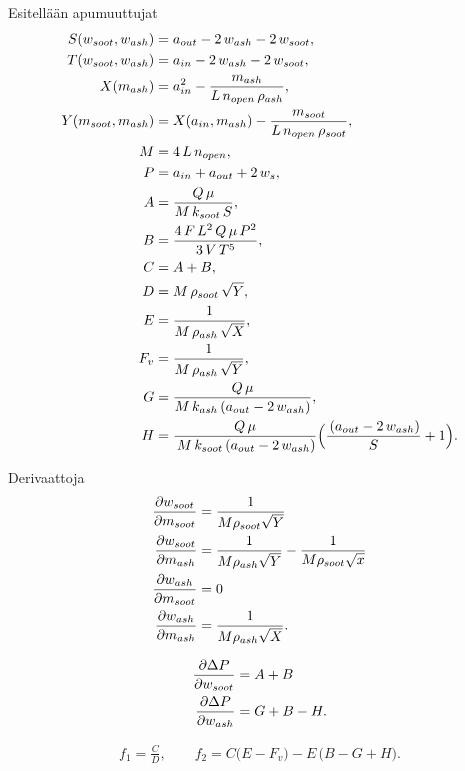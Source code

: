 \newpage
Esitellään apumuuttujat
\begin{align*}
S(w_{{soot}}, w_{{ash}}) &=a_{{out}}-2\,w_{{ash}}-2\,w_{{soot}},\\
T(w_{{soot}}, w_{{ash}}) &=a_{{in}}-2\,w_{{ash}}-2\,w_{{soot}},\\
X(m_{{ash}})            &=a_{{in}}^2 -\frac{m_{{ash}}}{L\,n_{{open}}\,\rho_{{ash}}},\\
Y(m_{{soot}}, m_{{ash}}) &=X(a_{{in}},m_{{ash}})
        -\frac{m_{{soot}}}{L\,n_{{open}}\,\rho_{{soot}}},\\ 
M &=4\,L\,n_{{open}},\\
P &=a_{{in}}+a_{{out}}+2\,w_s,\\
A &=\frac{Q\,\mu}{M\,k_{{soot}}\,S},\\
B &= \frac{4\,F\,L^2\,Q\,\mu\,P^2}{3\,V\,T^5},\\
C &= A + B,\\
D &=M\,\rho_{{soot}}\,\sqrt{Y},\\
E &=\frac{1}{M\,\rho_{{ash}}\,\sqrt{X}},\\
F_v &= \frac{1}{M\,\rho_{{ash}}\,\sqrt{Y}},\\
G &=\frac{Q\,\mu}{M\,k_{{ash}}\,(a_{{out}}-2\,w_{{ash}})},\\
H &=\frac{Q\,\mu}{\,M\,k_{{soot}}\,(a_{{out}}-2\,w_{{ash}})}
      \Bigl(\frac{\,(a_{{out}}-2\,w_{{ash}})}{S}+1\Bigr).
\end{align*}

Derivaattoja
\begin{align}
    \frac{\partial w_{soot}}{\partial m_{soot}} &= \frac{1}{M \rho_{soot}\sqrt{Y}} \\
    \frac{\partial w_{soot}}{\partial m_{ash}} &= \frac{1}{M\rho_{ash}\sqrt{Y}} - \frac{1}{M\rho_{soot}\sqrt{x}} \\
    \frac{\partial w_{ash}}{\partial m_{soot}}&=0\\
    \frac{\partial w_{ash}}{\partial m_{ash}} &= \frac{1}{M \rho_{ash}\sqrt{X}}.
\end{align}

\begin{align}
    \frac{\partial \Delta P}{\partial w_{soot}} &= A+B\\
    \frac{\partial \Delta P}{\partial w_{ash}} &= G+B-H.
\end{align}


\begin{align}
    \boxed{
        f_{1} =\frac{C}{D},
        \qquad
        f_{2} =C\bigl(E - F_v\bigr)-E\,\bigl(B - G + H\bigr).
        }
\end{align}

